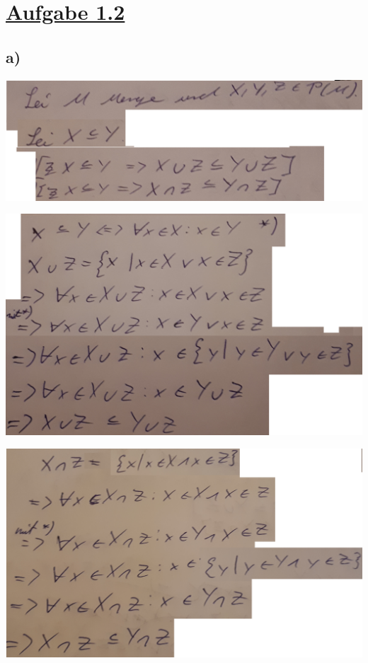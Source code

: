 \section*{\underline{Aufgabe 1.2}}

\subsection*{a)}

\includegraphics[width=\textwidth]{part/S1A2a1}

\includegraphics[width=\textwidth]{part/S1A2a2}

\includegraphics[width=\textwidth]{part/S1A2a3}
